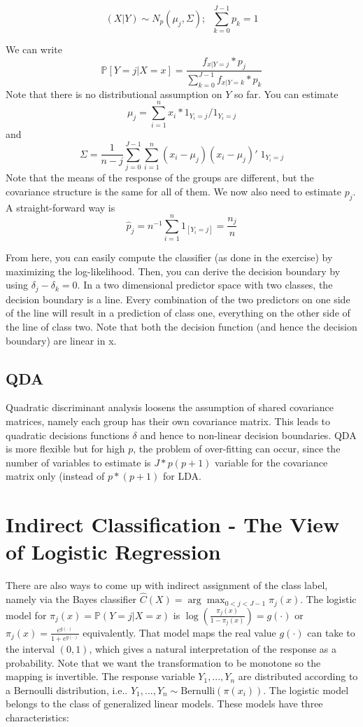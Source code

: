 \documentclass[]{book}
\begin{document}
\[ (X| Y) \sim N_p(\mu_j, \Sigma); \;\; \sum\limits_{k = 0}^{J-1}p_k = 1\]

We can write
\[ \mathbb{P}[Y = j | X = x] = \frac{f_{ x | Y = j } * p_j}{\sum\limits_{k = 0}^{J-1} f_{x | Y = k} * p_k} \]
Note that there is no distributional assumption on \(Y\) so far. You can
estimate
\[\mu_j = \sum\limits_{i = 1}^n{x_i*1_{Y_i = j}} / 1_{Y_i = j}\] and
\[\Sigma = \frac{1}{n-j}\sum\limits_{j = 0}^{J-1}\sum\limits_{i = 1}^n(x_i - \mu_j)(x_i - \mu_j)'\;1_{Y_i = j} \]
Note that the means of the response of the groups are different, but the
covariance structure is the same for all of them. We now also need to
estimate \(p_j\). A straight-forward way is
\[ \hat{p}_j = n^{-1}\sum\limits_{i = 1}^n{1_{[Y_i = j]}} = \frac{n_j}{n} \]

From here, you can easily compute the classifier (as done in the
exercise) by maximizing the log-likelihood. Then, you can derive the
decision boundary by using \(\delta_j - \delta_k = 0\). In a two
dimensional predictor space with two classes, the decision boundary is a
line. Every combination of the two predictors on one side of the line
will result in a prediction of class one, everything on the other side
of the line of class two. Note that both the decision function (and
hence the decision boundary) are linear in x.

\subsection{QDA}\label{qda}

Quadratic discriminant analysis loosens the assumption of shared
covariance matrices, namely each group has their own covariance matrix.
This leads to quadratic decisions functions \(\delta\) and hence to
non-linear decision boundaries. QDA is more flexible but for high \(p\),
the problem of over-fitting can occur, since the number of variables to
estimate is \(J*p(p+1)\) variable for the covariance matrix only
(instead of \(p*(p+1)\) for LDA.

\section{Indirect Classification - The View of Logistic
Regression}\label{indirect-classification---the-view-of-logistic-regression}

There are also ways to come up with indirect assignment of the class
label, namely via the Bayes classifier
\(\hat{C}(X) = \arg\max_{0<j<J-1}\hat{\pi}_j(x)\). The logistic model
for \(\pi_j(x) = \mathbb{P}(Y = j | X = x)\) is
\(\log(\frac{\pi_j(x)}{1-\pi_j(x)}) = g(\cdot)\) or
\(\pi_j(x) = \frac{e^{g(\cdot)}}{1+ e^{g(\cdot)}}\) equivalently. That
model maps the real value \(g(\cdot)\) can take to the interval
\((0, 1)\), which gives a natural interpretation of the response as a
probability. Note that we want the transformation to be monotone so the
mapping is invertible. The response variable \(Y_1, ..., Y_n\) are
distributed according to a Bernoulli distribution, i.e..
\(Y_1, ..., Y_n \sim \textrm{Bernulli}(\pi(x_i))\). The logistic model
belongs to the class of generalized linear models. These models have
three characteristics:
\end{document}
